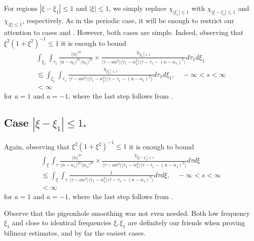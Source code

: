 \documentclass[12pt,reqno]{amsart}
\numberwithin{equation}{section}  %
\renewcommand{\cref}{\Cref}
\begin{document}
For regions $| \xi - \xi_{1} | \le 1$ and $|\xi| \le 1$, we simply replace $\chi_{| \xi_{1}| \le 1}$ with $\chi_{| \xi - \xi_{1} | \le 1}$ and $\chi_{|\xi| \le 1}$, respectively.
As in the periodic case, it will be enough to 
restrict our attention to cases  and .
However, both cases are simple. Indeed, observing that
$\xi^{2}(1 + \xi^{2})^{-1} \le 1$
it is enough to bound
\begin{equation}
\label{region-4-1-np-d}
\begin{split}
& \int_{\xi_{1}} \int_{\tau_{1}} \frac{\langle n \rangle ^{2s}}{\langle n - n_{1}\rangle ^{2s} \langle n_{1} \rangle^{2s}}  \times \frac{\chi_{| \xi_{1} | \le 1} }{\langle \tau - an^{2} \rangle \langle
\tau_{1} - n_{1}^{2} \rangle  \langle \tau - \tau_{1} - (n - n_{1})^{2} \rangle} d \tau_{1} d \xi_{1}
\\
& \lesssim
\int_{\xi_{1}} \int_{\tau_{1}} \frac{\chi_{| \xi_{1} | \le 1} }{\langle \tau - an^{2} \rangle \langle
\tau_{1} - n_{1}^{2} \rangle  \langle \tau - \tau_{1} - (n - n_{1})^{2} \rangle} d \tau_{1} d \xi_{1}, \quad -\infty < s < \infty
\\
& < \infty 
\end{split}
\end{equation}
for $a=1$ and $a=-1$, where the last step follows from \cref{lem:calc}. 
\subsection{Case $| \xi - \xi_{1}| \le 1$.} 
Again, observing that
$\xi^{2}(1 + \xi^{2})^{-1} \le 1$
it is enough to bound
\begin{equation}
\label{region-4-1-np-e}
\begin{split}
& \int_{\xi} \int_{\tau} \frac{\langle n \rangle ^{2s}}{\langle n - n_{1}\rangle ^{2s} \langle n_{1} \rangle^{2s}}  \times \frac{\chi_{| \xi - \xi_{1} | \le 1} }{\langle \tau - an^{2} \rangle \langle
\tau_{1} - n_{1}^{2} \rangle  \langle \tau - \tau_{1} - (n - n_{1})^{2} \rangle} d \tau d \xi
\\
& \lesssim
\int_{\xi} \int_{\tau} \frac{1}{\langle \tau - an^{2} \rangle \langle
\tau_{1} - n_{1}^{2} \rangle  \langle \tau - \tau_{1} - (n - n_{1})^{2} \rangle} d \tau d \xi, \quad -\infty < s < \infty
\\
& < \infty 
\end{split}
\end{equation}
for $a = 1$ and $a=-1$, where the last step follows from \cref{lem:calc}. 
\begin{framed}
Observe that the pigeonhole smoothing was not even needed. Both low frequency $\xi_{1}$ and close to identical frequencies $\xi, \xi_{1}$ are definitely our friends when proving bilinear estimates, and by far the easiest cases.
\end{framed}
\end{document}
